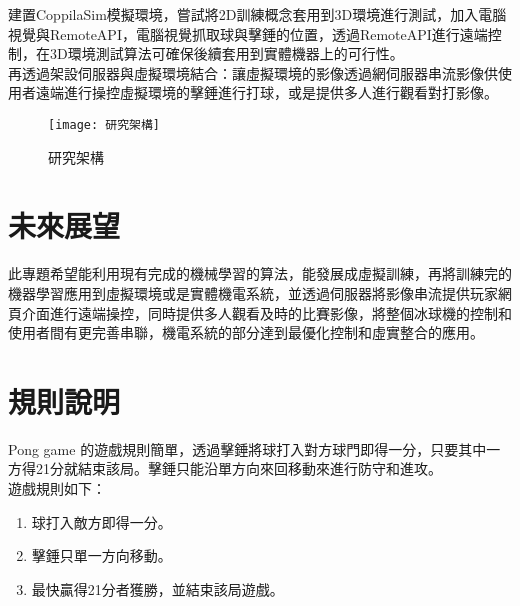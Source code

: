 建置CoppilaSim模擬環境，嘗試將2D訓練概念套用到3D環境進行測試，加入電腦視覺與RemoteAPI，電腦視覺抓取球與擊錘的位置，透過RemoteAPI進行遠端控制，在3D環境測試算法可確保後續套用到實體機器上的可行性。\\
 
 再透過架設伺服器與虛擬環境結合：讓虛擬環境的影像透過網伺服器串流影像供使用者遠端進行操控虛擬環境的擊錘進行打球，或是提供多人進行觀看對打影像。
\begin{figure}[hbt!]
\begin{center}
\texttt{[image: 研究架構]}
\caption{\Large 研究架構 }
\label{研究架構 }
\end{center}
\end{figure}
\section{未來展望}
此專題希望能利用現有完成的機械學習的算法，能發展成虛擬訓練，再將訓練完的機器學習應用到虛擬環境或是實體機電系統，並透過伺服器將影像串流提供玩家網頁介面進行遠端操控，同時提供多人觀看及時的比賽影像，將整個冰球機的控制和使用者間有更完善串聯，機電系統的部分達到最優化控制和虛實整合的應用。
\section{規則說明}
 Pong game 的遊戲規則簡單，透過擊錘將球打入對方球門即得一分，只要其中一方得21分就結束該局。擊錘只能沿單方向來回移動來進行防守和進攻。\\
遊戲規則如下：
\begin{enumerate}
\item 球打入敵方即得一分。
\item 擊錘只單一方向移動。
\item 最快贏得21分者獲勝，並結束該局遊戲。
\end{enumerate}

\renewcommand{\baselinestretch}{0.5} %
